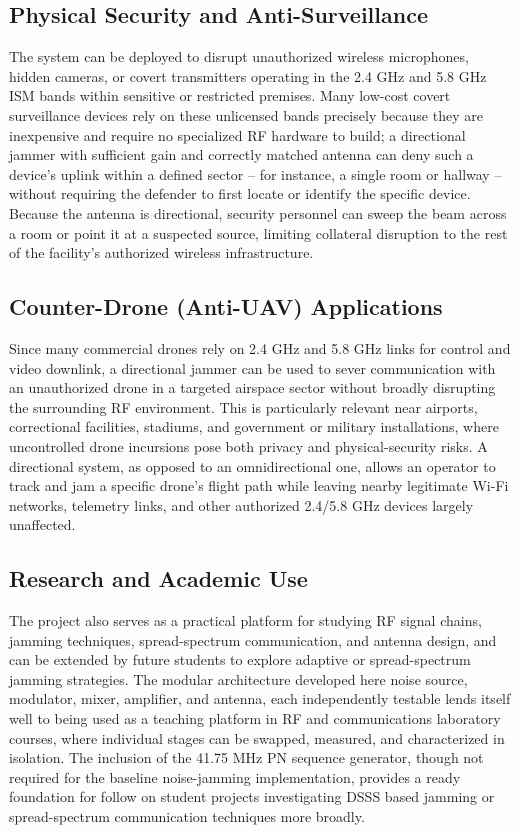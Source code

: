 \documentclass[12pt,a4paper]{report}
\begin{document}
	\subsection{Physical Security and Anti-Surveillance}
	The system can be deployed to disrupt unauthorized wireless microphones, hidden cameras, or covert transmitters operating in the 2.4 GHz and 5.8 GHz ISM bands within sensitive or restricted premises. Many low-cost covert surveillance devices rely on these unlicensed bands precisely because they are inexpensive and require no specialized RF hardware to build; a directional jammer with sufficient gain and correctly matched antenna can deny such a device’s uplink within a defined sector – for instance, a single room or hallway – without requiring the defender to first locate or identify the specific device. Because the antenna is directional, security personnel can sweep the beam across a room or point it at a suspected source, limiting collateral disruption to the rest of the facility’s authorized wireless infrastructure.
	\subsection{Counter-Drone (Anti-UAV) Applications}
	Since many commercial drones rely on 2.4 GHz and 5.8 GHz links for control and video downlink, a directional jammer can be used to sever communication with an unauthorized drone in a targeted airspace sector without broadly disrupting the surrounding RF environment. This is particularly relevant near airports, correctional facilities, stadiums, and government or military installations, where uncontrolled drone incursions pose both privacy and physical-security risks. A directional system, as opposed to an omnidirectional one, allows an operator to track and jam a specific drone’s flight path while leaving nearby legitimate Wi-Fi networks, telemetry links, and other authorized
	2.4/5.8 GHz devices largely unaffected.
	\subsection{Research and Academic Use}
	The project also serves as a practical platform for studying RF signal chains, jamming techniques, spread-spectrum communication, and antenna design, and can be extended by future students to explore adaptive or spread-spectrum jamming strategies. The modular architecture developed here noise source, modulator, mixer, amplifier, and antenna, each independently testable lends itself well to being used as a teaching platform in RF and communications laboratory courses, where individual stages can be swapped, measured, and characterized in isolation. The inclusion of the 41.75 MHz PN sequence generator, though not required for the baseline noise-jamming implementation, provides a ready foundation for follow on student projects investigating DSSS based jamming or spread-spectrum communication techniques more broadly.
\end{document}
